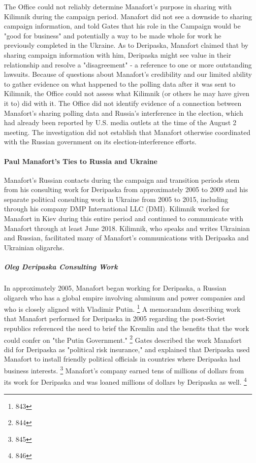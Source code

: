 The Office could not reliably determine Manafort's purpose in sharing with Kilimnik during the campaign period.
Manafort
did not see a downside to sharing campaign information, and told Gates that his role in the Campaign would be "good for business" and potentially a way to be made whole for work he previously completed in the Ukraine.
As to Deripaska, Manafort claimed that by sharing campaign information with him, Deripaska might see value in their relationship and resolve a "disagreement" - a reference to one or more outstanding lawsuits.
Because of questions about Manafort's credibility and our limited ability to gather evidence on what happened to the polling data after it was sent to Kilimnik, the Office could not assess what Kilimnik (or others he may have given it to) did with it.
The Office did not identify evidence of a connection between Manafort's sharing polling data and Russia's interference in the election, which had already been reported by U.S. media outlets at the time of the August 2 meeting.
The investigation did not establish that Manafort otherwise coordinated with the Russian government on its election-interference efforts.

\paragraph{Paul Manafort's Ties to Russia and Ukraine}

Manafort's Russian contacts during the campaign and transition periods stem from his consulting work for Deripaska from approximately 2005 to 2009 and his separate political consulting work in Ukraine from 2005 to 2015, including through his company DMP International LLC (DMI).
Kilimnik worked for Manafort in Kiev during this entire period and continued to communicate with Manafort through at least June 2018.
Kilimnik, who speaks and writes Ukrainian and Russian, facilitated many of Manafort's communications with Deripaska and Ukrainian oligarchs.

\subparagraph{Oleg Deripaska Consulting Work}

In approximately 2005, Manafort began working for Deripaska, a Russian oligarch who has a global empire involving aluminum and power companies and who is closely aligned with Vladimir Putin.%
\footnote{843}
A memorandum describing work that Manafort performed for Deripaska in 2005 regarding the post-Soviet republics referenced the need to brief the Kremlin and the benefits that the work could confer on "the Putin Government."%
\footnote{844}
Gates described the work Manafort did for Deripaska as "political risk insurance," and explained that Deripaska used Manafort to install friendly political officials in countries where Deripaska had business interests.%
\footnote{845}
Manafort's company earned tens of millions of dollars from its work for Deripaska and was loaned millions of dollars by Deripaska as well.%
\footnote{846}

